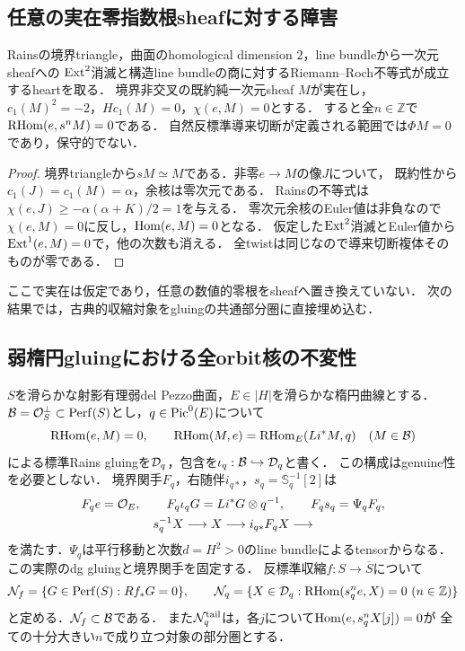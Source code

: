 \subsection{任意の実在零指数根sheafに対する障害}
\begin{proposition}[零指数の条件付き消失判定]\label{prop:zero-sheaf-obstruction}
Rainsの境界triangle，曲面のhomological dimension $2$，line bundleから一次元sheafへの
$\operatorname{Ext}^2$消滅と構造line bundleの商に対するRiemann--Roch不等式が成立するheartを取る．
境界非交叉の既約純一次元sheaf $M$が実在し，
$c_1(M)^2=-2$，$Hc_1(M)=0$，$\chi(e,M)=0$とする．
すると全$n\in\mathbb Z$で$\operatorname{RHom}(e,s^nM)=0$である．
自然反標準導来切断が定義される範囲では$\Phi M=0$であり，保守的でない．
\end{proposition}
\begin{proof}
境界triangleから$sM\simeq M$である．非零$e\to M$の像$J$について，
既約性から$c_1(J)=c_1(M)=\alpha$，余核は零次元である．
Rains\cite[Corollary 10.16]{Rains}の不等式は
$\chi(e,J)\ge-\alpha(\alpha+K)/2=1$を与える．
零次元余核のEuler値は非負なので$\chi(e,M)=0$に反し，$\operatorname{Hom}(e,M)=0$となる．
仮定した$\operatorname{Ext}^2$消滅とEuler値から$\operatorname{Ext}^1(e,M)=0$で，他の次数も消える．
全twistは同じなので導来切断複体そのものが零である．
\end{proof}
ここで実在は仮定であり，任意の数値的零根をsheafへ置き換えていない．
次の結果では，古典的収縮対象をgluingの共通部分圏に直接埋め込む．

\subsection{弱楕円gluingにおける全orbit核の不変性}
$S$を滑らかな射影有理弱del Pezzo曲面，$E\in|H|$を滑らかな楕円曲線とする．
$\mathcal B=\mathcal O_S^\perp\subset\operatorname{Perf}(S)$とし，$q\in\operatorname{Pic}^0(E)$について
\begin{equation}\label{eq:weak-wall-gluing}
 \operatorname{RHom}(e,M)=0,\qquad \operatorname{RHom}(M,e)=\operatorname{RHom}_E(Li^*M,q)\quad(M\in\mathcal B)
\end{equation}
による標準Rains gluingを$\mathcal D_q$，包含を$\iota_q:\mathcal B\hookrightarrow\mathcal D_q$と書く．
この構成はgenuine性を必要としない\cite[\S4, (4.4)--(4.7)]{Filtered}．
境界関手$F_q$，右随伴$i_{q*}$，$s_q=\mathbb S_q^{-1}[2]$は
\begin{equation}\label{eq:weak-wall-boundary}
 \begin{gathered}
 F_qe=\mathcal O_E,\qquad F_q\iota_qG=Li^*G\otimes q^{-1},\qquad F_qs_q=\Psi_qF_q,\\
 s_q^{-1}X\longrightarrow X\longrightarrow i_{q*}F_qX\longrightarrow
 \end{gathered}
\end{equation}
を満たす．$\Psi_q$は平行移動と次数$d=H^2>0$のline bundleによるtensorからなる．
この実際のdg gluingと境界関手を固定する．
反標準収縮$f:S\to\overline S$について
\[
 \mathcal N_f=\{G\in\operatorname{Perf}(S):Rf_*G=0\},\qquad
 \mathcal N_q=\{X\in\mathcal D_q:\operatorname{RHom}(s_q^ne,X)=0\ (n\in\mathbb Z)\}
\]
と定める．$\mathcal N_f\subset\mathcal B$である．
また$\mathcal N_q^{\rm tail}$は，各$j$について$\operatorname{Hom}(e,s_q^nX[j])=0$が
全ての十分大きい$n$で成り立つ対象の部分圏とする．

